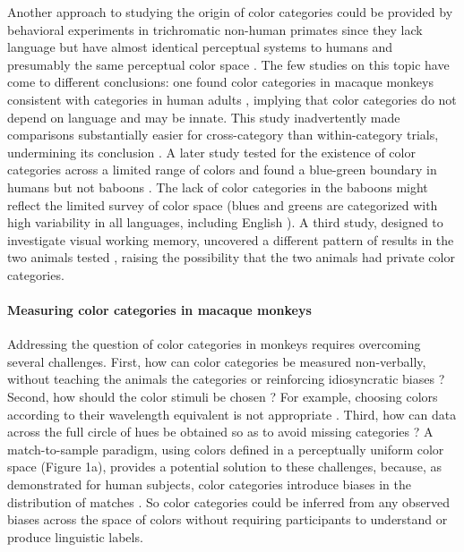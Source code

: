 \documentclass[9pt,biorxiv,lineno,onehalfspacing]{lapreprint}
\begin{document}
\begin{refsection}
Another approach to studying the origin of color categories could be provided by behavioral experiments in trichromatic non-human primates \citep{sandell_color_1979,carey_where_2009,RN18699,siuda-krzywicka_biological_2019} since they lack language but have almost identical perceptual systems to humans and presumably the same perceptual color space \citep{schnapf_spectral_1987,stoughton_psychophysical_2012,gagin_color-detection_2014, horwitz_what_2015}. The few studies on this topic have come to different conclusions: one found color categories in macaque monkeys consistent with categories in human adults \citep{sandell_color_1979}, implying that color categories do not depend on language and may be innate.
This study inadvertently made comparisons substantially easier for cross-category than within-category trials, undermining its conclusion \citep{davidoff_cross-species_2010}. 
A later study tested for the existence of color categories across a limited range of colors and found a blue-green boundary in humans but not baboons \citep{fagot_cross-species_2006,RN18699}. The lack of color categories in the baboons might reflect the limited survey of color space (blues and greens are categorized with high variability in all languages, including English \citep{gibson_color_2017}). A third study, designed to investigate visual working memory, uncovered a different pattern of results in the two animals tested \citep{panichello_error-correcting_2019}, raising the possibility that the two animals had private color categories. 

\paragraph{Measuring color categories in macaque monkeys}

Addressing the question of color categories in monkeys requires overcoming several challenges. 
First, how can color categories be measured non-verbally, without teaching the animals the categories or reinforcing idiosyncratic biases \citep{essock_color_1977,matsuno_color_2004}? 
Second, how should the color stimuli be chosen \citep{siuda-krzywicka_biological_2019}?
For example, choosing colors according to their wavelength equivalent 
\citep{sandell_color_1979} is not appropriate 
\citep{davidoff_cross-species_2010}.
Third, how can data across the full circle of hues be obtained so as to avoid missing categories \citep{fagot_cross-species_2006}? 
A match-to-sample paradigm, using colors defined in a perceptually uniform color space \citep{stockman_colorimetry_2010} (Figure 1a), provides a potential solution to these challenges, because, as demonstrated for human subjects, color categories introduce biases in the distribution of matches \citep{bae_why_2015}. 
So color categories could be inferred from any observed biases across the space of colors without requiring participants to understand or produce linguistic labels.  


\end{refsection}
\end{document}
